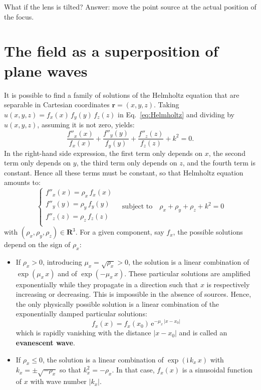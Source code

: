 \documentclass[a4paper]{article}
\newcommand{\oops}[1]{{\color{purple}#1}}
\newcommand*{\V}[1]{\boldsymbol{#1}}
\newcommand*{\mathe}{\mathrm{e}}
\newcommand*{\mathi}{\mathrm{i}}
\begin{document}
\oops{What if the lens is tilted? Answer: move the point source at the actual
  position of the focus.}

\newpage
\appendix

\section{The field as a superposition of plane waves}
\label{sec:plane-waves-superposition}

It is possible to find a family of solutions of the Helmholtz equation that are
separable in Cartesian coordinates $\V{r} = (x,y,z)$. Taking
$u(x,y,z) = f_{x}(x)\,f_{y}(y)\,f_{z}(z)$ in Eq.~\eqref{eq:Helmholtz} and
dividing by $u(x,y,z)$, assuming it is not zero, yields:
\begin{displaymath}
  \frac{f''_{x}(x)}{f_{x}(x)} +
  \frac{f''_{y}(y)}{f_{y}(y)} +
  \frac{f''_{z}(z)}{f_{z}(z)} + k^{2} = 0.
\end{displaymath}
In the right-hand side expression, the first term only depends on $x$, the
second term only depends on $y$, the third term only depends on $z$, and the
fourth term is constant. Hence all these terms must be constant, so that
Helmholtz equation amounts to:
\begin{displaymath}
  \begin{cases}
    f''_{x}(x) = ρ_{x}\,f_{x}(x)\\
    f''_{y}(y) = ρ_{y}\,f_{y}(y)\\
    f''_{z}(z) = ρ_{z}\,f_{z}(z)\\
  \end{cases}
  \quad\text{subject to}\quad
  ρ_{x} + ρ_{y} + ρ_{z} + k^{2} = 0
\end{displaymath}
with $(ρ_{x},ρ_{y},ρ_{z}) ∈ \mathbb{\V{R}}^{3}$. For a given
component, say $f_{x}$, the possible solutions depend on the sign
of $ρ_{x}$:
\begin{itemize}
\item If $ρ_{x} > 0$, introducing $μ_{x} = \sqrt{ρ_{x}} > 0$, the
      solution is a linear combination of $\exp(μ_{x}\,x)$ and of
      $\exp(-μ_{x}\,x)$. These particular solutions are amplified exponentially
      while they propagate in a direction such that $x$ is respectively
      increasing or decreasing. This is impossible in the absence of sources.
      Hence, the only physically possible solution is a linear combination of
      the exponentially damped particular solutions:
      \begin{displaymath}
        f_{x}(x) = f_{x}(x_{0})\,\mathe^{-μ_{x}\,|x - x_{0}|}
      \end{displaymath}
      which is rapidly vanishing with the distance $|x - x_{0}|$ and is called
      an \textbf{evanescent wave}.

\item If $ρ_{x} ≤ 0$, the solution is a linear combination of
      $\exp(\mathi\,k_{x}\,x)$ with $k_{x} = ±\sqrt{-ρ_{x}}$ so that
      $k_{x}^{2} = -ρ_{x}$. In that case, $f_{x}(x)$ is a sinusoidal
      function of $x$ with wave number $|k_{x}|$.
\end{itemize}
\end{document}
